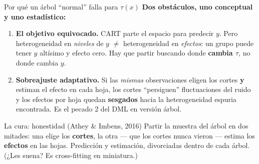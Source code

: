 \documentclass{beamer}
\newcommand{\1}{\mathbb{I}}
\begin{document}
\begin{frame}{Por qué un árbol ``normal'' falla para $\tau(x)$}
\small
\textbf{Dos obstáculos, uno conceptual y uno estadístico:}
\pause
\begin{enumerate}\itemsep6pt
  \item \textbf{El objetivo equivocado.} CART parte el espacio para predecir \textbf{$y$}. Pero heterogeneidad en \emph{niveles} de $y$ $\neq$ heterogeneidad en \emph{efectos}: un grupo puede tener $y$ altísimo y efecto cero. Hay que partir buscando donde \textbf{cambia $\tau$}, no donde cambia $y$. \pause
  \item \textbf{Sobreajuste adaptativo.} Si las \emph{mismas} observaciones eligen los cortes \textbf{y} estiman el efecto en cada hoja, los cortes ``persiguen'' fluctuaciones del ruido y los efectos por hoja quedan \textbf{sesgados} hacia la heterogeneidad espuria encontrada. Es el pecado 2 del DML en versión árbol. \pause
\end{enumerate}

\vspace{0.15cm}
\begin{block}{La cura: honestidad (Athey \& Imbens, 2016)}
Partir la muestra del árbol en dos mitades: una elige los \textbf{cortes}, la otra --- que los cortes nunca vieron --- estima los \textbf{efectos} en las hojas. Predicción y estimación, divorciadas dentro de cada árbol. (¿Les suena? Es cross-fitting en miniatura.)
\end{block}
\end{frame}
\end{document}
